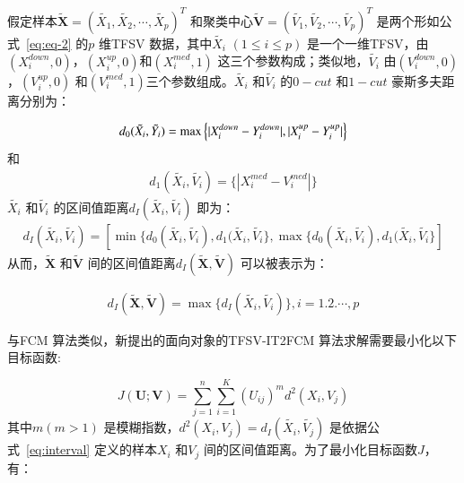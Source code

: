 假定样本$\bm{\tilde{X}} = (\tilde{X_1}, \tilde{X_2},\cdots, \tilde{X_p})^T$ 和聚类中心$\bm{\tilde{V}} = (\tilde{V_1}, \tilde{V_2},\cdots, \tilde{V_p})^T$ 是两个形如公式~\ref{eq:eq-2} 的$p$ 维TFSV 数据，其中$\tilde{X_i}$ $(1 \leq i \leq p)$ 是一个一维TFSV，由$(X_{i}^{down}, 0)$，$(X_{i}^{up}, 0)$和$(X_i^{med}, 1)$ 这三个参数构成；类似地，$\tilde{V_i}$ 由$(V_{i}^{down}, 0)$，$(V_{i}^{up}, 0)$ 和$(V_i^{med}, 1)$三个参数组成。$\tilde{X_i}$ 和$\tilde{V_i}$ 的$0-cut$ 和$1-cut$ 豪斯多夫距离分别为：

\begin{equation}\label{eq:eq-3}
    \begin{split}
        d_0 (\tilde{X_i}, \tilde{Y_{i}}) = \max \Big \lbrace \lvert X_i^{down} - Y_i^{down}\rvert, \lvert X_i^{up} - Y_i^{up}\rvert \Big \rbrace
    \end{split}
\end{equation}
和
\begin{equation}\label{eq:eq-4}
    \begin{split}
        d_1 (\tilde{X_i}, \tilde{V_{i}}) = \Big\lbrace |X_i^{med} - V_i^{med}| \Big\rbrace
    \end{split}
\end{equation}
$\tilde{X_i}$ 和$\tilde{V_{i}}$ 的区间值距离$d_{I} (\tilde{X_i}, \tilde{V_i})$ 即为：
\begin{equation}\label{eq:eq-5}
    \begin{split}
        d_{I} (\tilde{X_i}, \tilde{V_i}) = [\min \lbrace d_0 (\tilde{X_i}, \tilde{V_{i}}) , d_1 (\tilde{X_i}, \tilde{V_{i}}  \rbrace,\max  \lbrace d_0 (\tilde{X_i}, \tilde{V_{i}}) , d_1 (\tilde{X_i}, \tilde{V_{i}}  \rbrace]
    \end{split}
\end{equation}
从而，$\bm{\tilde{X}}$ 和$\bm{\tilde{V}}$ 间的区间值距离$d_{I} (\bm{\tilde{X}}, \bm{\tilde{V}})$ 可以被表示为：

\begin{equation}\label{eq:eq-6}
    \begin{split}
        d_{I} (\bm{\tilde{X}}, \bm{\tilde{V}}) = \max \lbrace d_{I} (\tilde{X_i}, \tilde{V_i}) \rbrace, i =1.2.\cdots,p
    \end{split}
\end{equation}

与FCM 算法类似，新提出的面向对象的TFSV-IT2FCM 算法求解需要最小化以下目标函数:

\begin{equation}\label{eq:eq-7}
    J(\bm{U};\bm{V}) = \sum _{j=1} ^{n} \sum_{i=1} ^K (U_{ij})^m d^2(X_i,V_j)
\end{equation}
其中$m (m>1)$ 是模糊指数，$d^2(X_i,V_j) = d_{I} (\tilde{X_i}, \tilde{V_j})$ 是依据公式~\ref{eq:interval} 定义的样本$X_i$ 和$V_j$ 间的区间值距离。为了最小化目标函数$J$，有：

